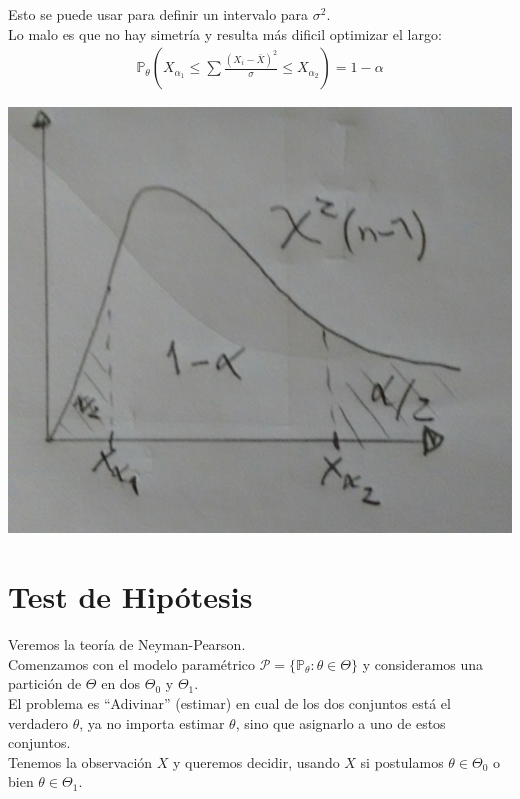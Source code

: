 \documentclass[10pt]{article}
\theoremstyle{plain}
\theoremstyle{definition}
\begin{document}
 Esto se puede usar para definir un intervalo para $\sigma^2$.\\
 Lo malo es que no hay simetría y resulta más dificil optimizar el largo:
 \begin{align*}
 \mathbb{P}_{\theta}(X_{\alpha_{1}}\le \sum {\frac{(X_{i}-\bar{X})^2}{\sigma}} \le X_{\alpha_{2}}) = 1-\alpha
 \end{align*}
 \begin{center}
 \includegraphics[scale=0.2]{imagenes/distr3.jpg}
 \end{center}
 \section{Test de Hipótesis}
 Veremos la teoría de Neyman-Pearson.\\
 
 Comenzamos con el modelo paramétrico $\mathcal{P} = \{\mathbb{P}_{\theta}\colon \theta \in \Theta\}$ y consideramos una partición de $\Theta$ en dos $\Theta_{0}$ y $\Theta_{1}$.\\
 
 El problema es ``Adivinar'' (estimar) en cual de los dos conjuntos está el verdadero $\theta$, ya no importa estimar $\theta$, sino que asignarlo a uno de estos conjuntos.\\
 
 Tenemos la observación $X$ y queremos decidir, usando $X$ si postulamos $\theta \in \Theta_{0}$ o bien $\theta \in \Theta_{1}$.
 
\end{document}
